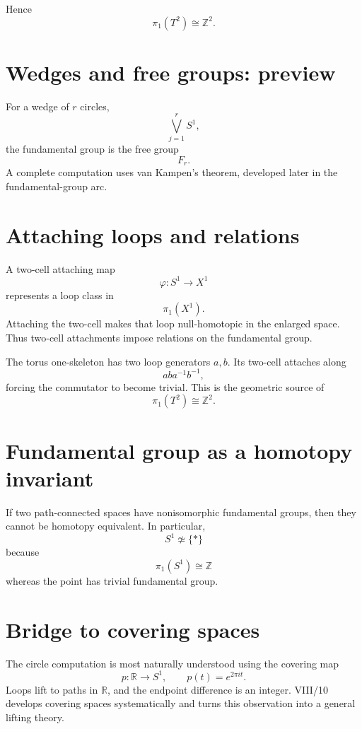 Hence
\[
\pi_1(T^2)\cong\mathbb Z^2.
\]

\section{Wedges and free groups: preview}

For a wedge of \(r\) circles,
\[
\bigvee_{j=1}^rS^1,
\]
the fundamental group is the free group
\[
F_r.
\]
A complete computation uses van Kampen's theorem, developed later in the
fundamental-group arc.

\section{Attaching loops and relations}

A two-cell attaching map
\[
\varphi:S^1\to X^1
\]
represents a loop class in
\[
\pi_1(X^1).
\]
Attaching the two-cell makes that loop null-homotopic in the enlarged space.
Thus two-cell attachments impose relations on the fundamental group.

\begin{example}
\label{ex:viii09-torus-relation}
The torus one-skeleton has two loop generators \(a,b\).  Its two-cell attaches
along
\[
aba^{-1}b^{-1},
\]
forcing the commutator to become trivial.  This is the geometric source of
\[
\pi_1(T^2)\cong\mathbb Z^2.
\]
\end{example}

\section{Fundamental group as a homotopy invariant}

If two path-connected spaces have nonisomorphic fundamental groups, then they
cannot be homotopy equivalent.  In particular,
\[
S^1\not\simeq\{*\}
\]
because
\[
\pi_1(S^1)\cong\mathbb Z
\]
whereas the point has trivial fundamental group.

\section{Bridge to covering spaces}

The circle computation is most naturally understood using the covering map
\[
p:\mathbb R\to S^1,
\qquad
p(t)=e^{2\pi it}.
\]
Loops lift to paths in \(\mathbb R\), and the endpoint difference is an integer.
VIII/10 develops covering spaces systematically and turns this observation into
a general lifting theory.



